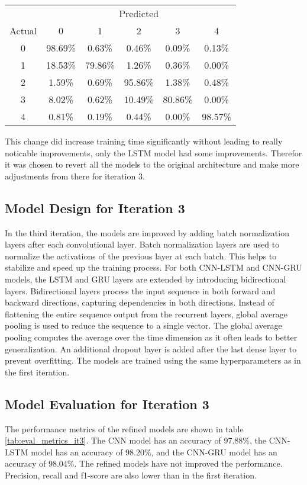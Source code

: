 \begin{table}[ht]
\begin{minipage}{0.32\textwidth}
        \begin{tabular}{cccccc}
            \toprule
            & \multicolumn{5}{c}{Predicted} \\
            \cmidrule(lr){2-6}
            Actual & 0 & 1 & 2 & 3 & 4 \\
            \midrule
            0 & 98.69\% & 0.63\% & 0.46\% & 0.09\% & 0.13\% \\
            1 & 18.53\% & 79.86\% & 1.26\% & 0.36\% & 0.00\% \\
            2 & 1.59\%  & 0.69\% & 95.86\% & 1.38\% & 0.48\% \\
            3 & 8.02\%  & 0.62\% & 10.49\% & 80.86\% & 0.00\% \\
            4 & 0.81\%  & 0.19\% & 0.44\% & 0.00\% & 98.57\% \\
            \bottomrule
        \end{tabular}
    \end{minipage}
\end{table}

This change did increase training time significantly without leading to really noticable improvements, only the LSTM model had some improvements. Therefor it was chosen to revert all the models to the original architecture and make more adjustments from there for iteration 3. 

\subsection{Model Design for Iteration 3}
In the third iteration, the models are improved by adding batch normalization layers after each convolutional layer. Batch normalization layers are used to normalize the activations of the previous layer at each batch. This helps to stabilize and speed up the training process. 
For both CNN-LSTM and CNN-GRU models, the LSTM and GRU layers are extended by introducing bidirectional layers. Bidirectional layers process the input sequence in both forward and backward directions, capturing dependencies in both directions. Instead of flattening the entire sequence output from the recurrent layers, global average pooling is used to reduce the sequence to a single vector. The global average pooling computes the average over the time dimension as it often leads to better generalization. An additional dropout layer is added after the last dense layer to prevent overfitting.
The models are trained using the same hyperparameters as in the first iteration.

\subsection{Model Evaluation for Iteration 3}
The performance metrics of the refined models are shown in table \ref{tab:eval_metrics_it3}. The CNN model has an accuracy of 97.88\%, the CNN-LSTM model has an accuracy of 98.20\%, and the CNN-GRU model has an accuracy of 98.04\%. The refined models have not improved the performance. Precision, recall and f1-score are also lower than in the first iteration.

